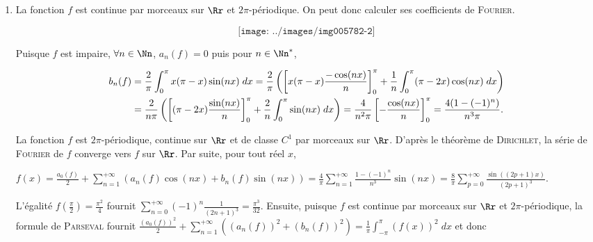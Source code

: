 {{\begin{enumerate}
\begin{center}
\end{center}

\item  La fonction $f$ est continue par morceaux sur $\Rr$ et $2\pi$-périodique. On peut donc calculer ses coefficients de \textsc{Fourier}.

$$\texttt{[image: ../images/img005782-2]}$$



Puisque $f$ est impaire, $\forall n\in\Nn$, $a_n(f)=0$ puis pour $n\in\Nn^*$, 

\begin{align*}\ensuremath
b_n(f)&=\frac{2}{\pi}\int_{0}^{\pi}x(\pi-x)\sin(nx)\;dx=\frac{2}{\pi}\left(\left[x(\pi-x)\frac{-\cos(nx)}{n}\right]_0^\pi+\frac{1}{n}\int_{0}^{\pi}(\pi-2x)\cos(nx)\;dx\right)\\
 &=\frac{2}{n\pi}\left(\left[(\pi-2x)\frac{\sin(nx)}{n}\right]_0^\pi+\frac{2}{n}\int_{0}^{\pi}\sin(nx)\;dx\right)=\frac{4}{n^2\pi}\left[-\frac{\cos(nx)}{n}\right]_0^\pi=\frac{4(1-(-1)^n)}{n^3\pi}.
\end{align*} 

La fonction $f$ est $2\pi$-périodique, continue sur $\Rr$ et de classe $C^1$ par morceaux sur $\Rr$. D'après le théorème de \textsc{Dirichlet}, la série de \textsc{Fourier} de $f$ converge vers $f$ sur $\Rr$. Par suite, pour tout réel $x$, 

\begin{center}
$f(x)=\frac{a_0(f)}{2}+\sum_{n=1}^{+\infty}(a_n(f)\cos(nx)+b_n(f)\sin(nx))=\frac{4}{\pi}\sum_{n=1}^{+\infty}\frac{1-(-1)^n}{n^3}\sin(nx)=\frac{8}{\pi}\sum_{p=0}^{+\infty}\frac{\sin((2p+1)x)}{(2p+1)^3}$.
\end{center}

\begin{center}
\end{center}

L'égalité $f\left(\frac{\pi}{2}\right)=\frac{\pi^2}{4}$ fournit $\sum_{n=0}^{+\infty}(-1)^n\frac{1}{(2n+1)^3}=\frac{\pi^3}{32}$. Ensuite,  puisque $f$ est continue par morceaux sur $\Rr$ et $2\pi$-périodique, la formule de \textsc{Parseval} fournit $\frac{(a_0(f))^2}{2}+\sum_{n=1}^{+\infty}((a_n(f))^2+(b_n(f))^2)=\frac{1}{\pi}\int_{-\pi}^{\pi}(f(x))^2\;dx$ et donc


\end{enumerate}}}
